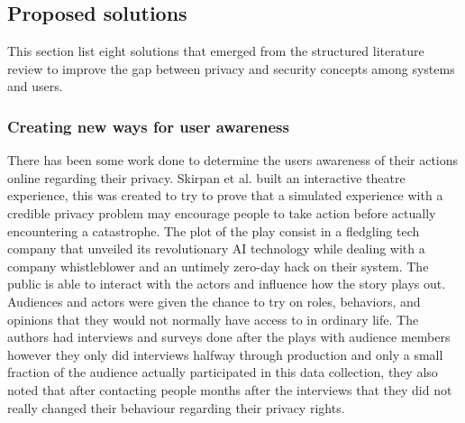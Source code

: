 
\subsection{Proposed solutions}

\par This section list eight solutions that emerged from the structured
literature review to improve the gap between privacy and security concepts
among systems and users.

\subsubsection{Creating new ways for user awareness}

There has been some work done to determine the users awareness of their
actions online regarding their privacy. Skirpan et al. \cite{SkirpanPrivacy}
built an interactive theatre experience, this was created to try to prove
that a simulated experience with a credible privacy problem may encourage
people to take action before actually encountering a catastrophe. The plot
of the play consist in a fledgling tech company that unveiled its revolutionary
AI technology while dealing with a company whistleblower and an untimely
zero-day hack on their system. The public is able to interact with the actors
and influence how the story plays out. Audiences and actors were given the
chance to try on roles, behaviors, and opinions that they would not normally
have access to in ordinary life. The authors had interviews and surveys
done after the plays with audience members however they only did interviews
halfway through production and only a small fraction of the audience actually
participated in this data collection, they also noted that after contacting
people months after the interviews that they did not really changed their
behaviour regarding their privacy rights.


